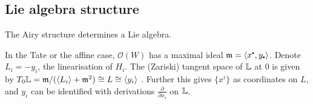     



    
    \iffalse 
    
    \subsection{Lie algebra structure}

    The Airy structure determines a Lie algebra. 
    
    In the Tate or the affine case, \( \mathcal{O}(W)\) has a maximal ideal \(\mathfrak{m} = \langle x^{\sbt}, y_{\sbt} \rangle\).  Denote \( L_i = -y_i \), the linearisation of \(H_i\). The (Zariski) tangent space of \( \mathbb{L}\) at \(0\) is given by \(  T_0 \cL = \mathfrak{m}/(\langle L_i \rangle  + \mathfrak{m}^2) \cong L \cong \langle y_i \rangle  \ \). Further this gives \(\{x^i\}\) as coordinates on \(L\), and \(y_i\) can be identified with derivations \( \frac{\partial}{\partial x_i}\) on \( \mathbb{L}\).

